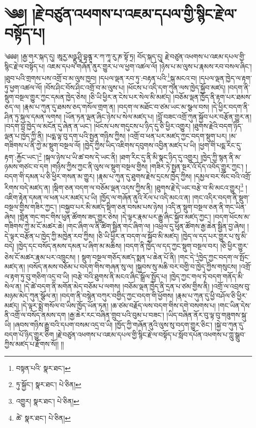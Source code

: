 \setcounter{footnote}{0} 
\chapter{༄༅། །རྗེ་བཙུན་འཕགས་པ་འཇམ་དཔལ་གྱི་སྙིང་རྗེ་ལ་བསྟོད་པ།}༄༅༅། །རྒྱ་གར་སྐད་དུ། ཨཱརྱ་མཉྫུ་ཤྲཱི་བྷནྚཱ་ར་ཀ་ཀཱ་རུ་ཎ་སྟོ་ཏྲ། བོད་སྐད་དུ། རྗེ་བཙུན་འཕགས་པ་འཇམ་དཔལ་གྱི་སྙིང་རྗེ་ལ་བསྟོད་པ། འཇམ་དཔལ་གཞོན་ནུར་གྱུར་པ་ལ་ཕྱག་འཚལ་ལོ། །ཉེས་པ་མ་ལུས་པ་རྣམས་རབ་བསལ་ཞིང་། །ཐུབ་པའི་གྲགས་པས་འགྲོ་བ་མ་ལུས་ཁྱབ། །དཔལ་ལྡན་རབ་ཏུ་:བརྟན་པའི་\footnote{བསྟན་པའི་  སྣར་ཐང་། }སྐུ་མངའ་བ། །དཔལ་ལྡན་ཁྱེད་ལ་རྟག་ཏུ་ཕྱག་འཚལ་ལོ། །བོས་ཤིང་བོས་ཤིང་འགྲོ་བ་མ་ལུས་པ། །ཕོངས་པ་འདི་དག་ཀུན་ལས་ཁྱེད་སྐྱོབ་མཛད། །བདག་ནི་སྡུག་བསྔལ་གྱུར་ཀྱང་དམན་ཁྱེད་ཅེས། །ཅི་ཡི་ཕྱིར་ན་ངེས་པར་སེལ་མི་མཛད། །བཅོམ་ལྡན་ཁྱོད་ནི་རྟག་པར་ཐམས་ཅད་ལ། །རྣམ་པ་ཀུན་དུ་ཐམས་ཅད་གསོལ་གྲག་ན། །བདག་ལ་མཐོང་བ་ཙམ་ཡང་མ་སྩལ་བས། །དེ་ཕྱིར་བདག་ནི་ཤིན་ཏུ་སྐལ་དམན་ལགས། །ཡོན་ཏན་ལྡན་ཞིང་ཉེས་པ་སེལ་མཛད་པ། །བློ་བཟང་འགྲོ་ཀུན་སྐྱོབ་པར་བརྩོན་གྱུར་ན། །བདག་བློ་ཁྱེད་ལ་མངོན་དུ་ཞེན་ན་ཡང་། །ཕོངས་པས་གདུངས་པ་ཉིད་དུ་ཅི་ཕྱིར་འགྱུར། །ཐུགས་རྗེའི་བདག་ཉིད་ལྡན་པ་ཁྱེད་ཀྱི་ནི། །པདྨ་ལྟ་བུ་དག་པའི་སྤྱན་གཉིས་ཀྱིས། །འགྲོ་བ་ཕན་པར་མཛད་ཀྱང་བདག་སྡུག་པར། །མ་གཟིགས་པ་ནི་ཀྱེ་མ་སྡུག་བསྔལ་ལོ། །ཁྱེད་ཀྱིས་ཡིད་འཇིགས་དབུགས་འབྱིན་མཛད་པ་ཡི། །ཕྱག་གི་པདྨ་རིང་དུ་རྟག་:རྐྱོང་ཡང་།\footnote{ཏུ་སྐྱོང་།  སྣར་ཐང་།  པེ་ཅིན། } །སྐལ་ཉེས་པ་ཡི་ཚ་བས་དེ་ཡང་ནི། །ཐག་རིང་དུ་ནི་མི་སྣང་ཉིད་དུ་འགྱུར། །ཁྱེད་ཀྱི་སྙན་ནི་མ་ཉམས་གཙང་བ་དག །གཉིས་ཀྱིས་ཀྱང་ནི་ལུས་ལ་སྡུག་བསྔལ་གྱིས། །གཟིར་ཏེ་སྤྱན་སྔར་འོ་དོད་འབོད་གྱུར་ཀྱང་། །བདག་གི་དམན་པ་ཅི་ཕྱིར་གསན་མ་གྱུར། །རྣམ་པ་ཀུན་དུ་ཐུགས་རྗེས་དྲངས་ཁྱེད་ཀྱིས། །དམྱལ་བར་སོང་བའི་འགྲོ་རིགས་བདེ་མཛད་ན། །སྡིག་ཅན་བདག་ལ་བཅོམ་ལྡན་འདས་ཀྱིས་ནི། །ཐུགས་རྗེ་དེ་ཡང་བརྩེ་བ་མི་མངའ་གྱུར།\footnote{འགྱུར།  སྣར་ཐང་།  པེ་ཅིན། } །འཇིག་རྟེན་དམན་ལ་ཕན་པར་མཛད་པ་ཡི། །ཁྱོད་ལ་གཞོན་ནུའི་རོལ་པ་འདི་མངའ་ན། །གང་འདིར་བདག་ནི་སྡུག་བསྔལ་གྱིས་གཟིར་ཀྱང་། །བསྐྱབ་པར་མི་མཛད་སྡིག་ཅན་བསམ་པས་ཉེས། །འདི་ན་སྡུག་བསྔལ་ཅན་ནི་གང་ཡིན་ཞེས། །གླེན་གང་གང་གིས་ཕུན་ཚོགས་ཟད་གྱུར་ཅེས། །དེ་ལྟར་རྣམ་པར་རྒྱུ་ཞིང་སྐྱོབ་མཛད་ཀྱང་། །བདག་ཕོངས་མ་གཟིགས་ཀྱེ་མ་ངོ་མཚར་ཆེ། །གང་ཞིག་ལ་ནི་ཚིག་སྦྱིན་གང་ཞིག་ལ། །འཕྲལ་དུ་ཕུན་ཚོགས་རྒྱ་ཆེན་སྦྱིན་བྱ་ཞེས། །དེ་ལྟར་བརྩོན་པ་ཁྱེད་ཀྱི་མཁྱེན་རབ་ཀྱིས། །ཅི་ཡི་ཕྱིར་ན་བདག་ལ་སྐྱོབ་མི་མཛད། །ཁྱེད་ལ་དད་པར་གྱུར་པ་སུ་མི་བདེ། །ཁྱེད་དང་བསོད་ནམས་དམན་པ་ཞིག་མ་མཆིས། །བདག་ནི་ཁྱེད་ལ་དད་ཀྱང་སྡུག་བསྔལ་བར། །ཅི་ཕྱིར་གྱུར་ཅེས་ངོ་མཚར་རྣམ་པར་འཁྲུངས། །
སྡུག་བསྔལ་གཅོད་མཛད་སྨན་པ་ཆེན་པོ་ནི། །གང་དེ་\footnote{ཚེ་  སྣར་ཐང་།  པེ་ཅིན། }ཁྱེད་ཀྱང་བདག་ལ་སྤོང་མཛད་ན། །བསོད་ནམས་བཅོམ་པ་བདག་གིས་གཞན་སུ་ལ། །སྐྱབས་སུ་མཆི་བར་བགྱི་བ་ཁྱེད་ཀྱིས་གསུངས། །འགྲོ་ལ་རྟག་ཏུ་བུ་གཅིག་འདྲ་བ་ཡི། །བརྩེ་བའི་ཐུགས་ནི་མངའ་ཞིང་སྒྲོལ་སྤྱོད་པ། །ཁྱེད་ཀྱང་གལ་ཏེ་བདག་གནོད་མི་སེལ་ན། །དེ་ཚེ་བདག་ནི་མགོན་མེད་བཅོམ་པ་ལགས། །བཅོམ་ལྡན་ཁྱེད་ནི་དྲན་པ་ཙམ་གྱིས་ནི། །འགྲོ་ལ་འབྲས་བུ་མཉམ་མེད་ཀུན་སྩོལ་ན། །བདག་ནི་བསྙེན་བཀུར་བགྱིད་ཀྱང་བདག་གི་ཕྱོགས། །རྣམ་པ་ཀུན་དུ་ཕྱི་བཤོལ་ཅི་ཕྱིར་མཛད། །དེ་ལྟར་སྨྲེ་གསོལ་བ་ཡིས་ཁྱོད་ཡོན་ཏན། །ཆ་ཙམ་བརྗོད་ལས་བདག་གིས་དགེ་བསགས་པ། །གང་ཡིན་དེས་ནི་འགྲོ་ལ་བསོད་ནམས་དག །རྒྱ་ཆེར་རང་བཞིན་གྲུབ་པའི་བུམ་པ་བཟང་། །ཡིད་བཞིན་ནོར་བུ་ལྟ་བུ་གཟུགས་སྐུ་ཡི། །ཞབས་གཉིས་རྒྱུ་བའི་དཔག་བསམ་འདྲ་བ་ཡི། །ཁྱོད་ཀྱི་གཞོན་ནུའི་ལུས་སུ་བདག་གྱུར་ཅིང་། །སྐྱེ་བ་ཀུན་དུ་བདག་པོ་ཉིད་གྱུར་ཅིག །རྗེ་བཙུན་འཕགས་པ་འཇམ་དཔལ་གྱི་སྙིང་རྗེ་ལ་བསྟོད་པ་སློབ་དཔོན་འཕགས་པ་ཀླུ་སྒྲུབ་ཀྱིས་མཛད་པ་རྫོགས་སོ།། །།